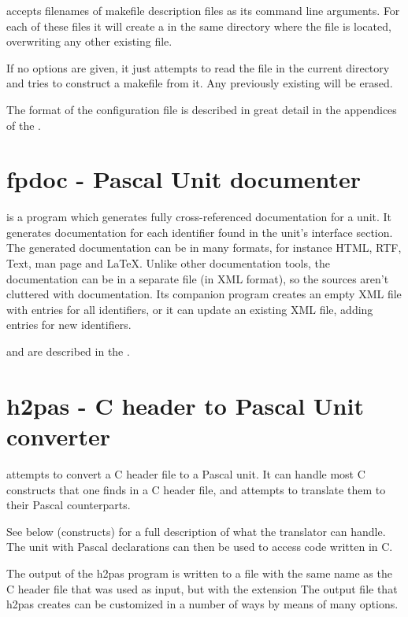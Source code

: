 accepts filenames of makefile description files as its
command line arguments. For each of these files it will create a
 in the same directory where the file is located,
overwriting any other existing file.

If no options are given, it just attempts to read the file 
in the current directory and tries to construct a makefile from it.
Any previously existing  will be erased.

The format of the  configuration file is described in great
detail in the appendices of the \progref.

\section{fpdoc - Pascal Unit documenter}

 is a program which generates fully cross-referenced
documentation for a unit. It generates documentation for each
identifier found in the unit's interface section. The generated
documentation can be in many formats, for instance HTML, RTF, Text, man
page and LaTeX.
Unlike other documentation tools, the documentation can be in a separate
file (in XML format), so the sources aren't cluttered with documentation.
Its companion program  creates an empty XML file with
entries for all identifiers, or it can update an existing XML file,
adding entries for new identifiers.

 and  are described in the \fpdocref.

\section{h2pas - C header to Pascal Unit converter}
 attempts to convert a C header file to a Pascal unit.
It can handle most C constructs that one finds in a C header file,
and attempts to translate them to their Pascal counterparts.

See below (constructs) for a full description of what the translator can handle.
The unit with Pascal declarations can then be used to access code written in C.

The output of the h2pas program is written to a file with the same name as
the C header file that was used as input, but with the extension 
The output file that h2pas creates can be customized in a number of ways by
means of many options.

